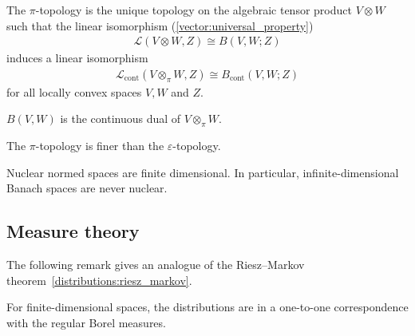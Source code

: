     \begin{uproperty}
        The $\pi$-topology is the unique topology on the algebraic tensor product $V\otimes W$ such that the linear isomorphism (\cref{vector:universal_property})
        \begin{gather}
            \mathcal{L}(V\otimes W,Z)\cong B(V,W;Z)
        \end{gather}
        induces a linear isomorphism
        \begin{gather}
            \mathcal{L}_{\text{cont}}(V\otimes_\pi W,Z)\cong B_{\text{cont}}(V,W;Z)
        \end{gather}
        for all locally convex spaces $V,W$ and $Z$.
    \end{uproperty}
    \begin{result}
        $B(V,W)$ is the continuous dual of $V\otimes_\pi W$.
    \end{result}

    \begin{property}
        The $\pi$-topology is finer than the $\varepsilon$-topology.
    \end{property}


    \begin{property}
        Nuclear normed spaces are finite dimensional. In particular, infinite-dimensional Banach spaces are never nuclear.
    \end{property}


\subsection{Measure theory}


    The following remark gives an analogue of the Riesz--Markov theorem~\ref{distributions:riesz_markov}.
    \begin{remark}
        For finite-dimensional spaces, the distributions are in a one-to-one correspondence with the regular Borel measures.
    \end{remark}

